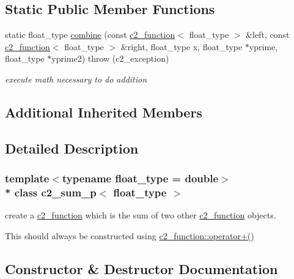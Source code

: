 \subsection*{Static Public Member Functions}
\begin{DoxyCompactItemize}
\item 
static float\+\_\+type \hyperlink{classc2__sum__p_a887d3abd4f31de3119a5c97e5558ef24}{combine} (const \hyperlink{classc2__function}{c2\+\_\+function}$<$ float\+\_\+type $>$ \&left, const \hyperlink{classc2__function}{c2\+\_\+function}$<$ float\+\_\+type $>$ \&right, float\+\_\+type x, float\+\_\+type $\ast$yprime, float\+\_\+type $\ast$yprime2)  throw (c2\+\_\+exception)
\begin{DoxyCompactList}\small\item\em execute math necessary to do addition \end{DoxyCompactList}\end{DoxyCompactItemize}
\subsection*{Additional Inherited Members}


\subsection{Detailed Description}
\subsubsection*{template$<$typename float\+\_\+type = double$>$\\*
class c2\+\_\+sum\+\_\+p$<$ float\+\_\+type $>$}

create a \hyperlink{classc2__function}{c2\+\_\+function} which is the sum of two other \hyperlink{classc2__function}{c2\+\_\+function} objects.

This should always be constructed using \hyperlink{classc2__function_a268b206b47c55e635e5f0a9e0f3e8ded}{c2\+\_\+function\+::operator+()} 

\subsection{Constructor \& Destructor Documentation}
